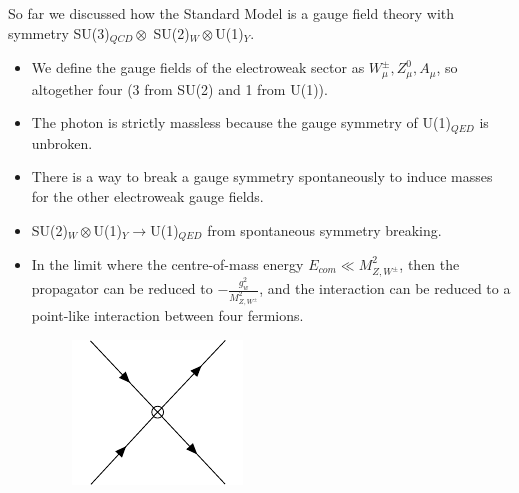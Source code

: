 \documentclass[relqm.tex]{subfiles}
\begin{document}
\chapter{}
    So far we discussed how the Standard Model is a gauge field theory with symmetry SU(3)$_{QCD}\otimes$ SU(2)$_W\otimes$U(1)$_{Y}$.
\begin{itemize}
    \item We define the gauge fields of the electroweak sector as $W^\pm_\mu,Z_\mu^0,A_\mu$, so altogether four (3 from SU(2) and 1 from U(1)).
    \item The photon is strictly massless because the gauge symmetry of U(1)$_{QED}$ is unbroken. 
    \item There is a way to break a gauge symmetry spontaneously to induce masses for the other electroweak gauge fields. 
    \item SU(2)$_W\otimes$U(1)$_Y\to$U(1)$_{QED}$ from spontaneous symmetry breaking.  
    \item In the limit where the centre-of-mass energy $E_{com}\ll M_{Z,W^{\pm}}^2$, then the propagator can be reduced to $-\frac{g_{w}^2}{M_{Z,W^{\pm}}^2}$, and the interaction can be reduced to a point-like interaction between four fermions. 
        \begin{figure}[H]
            \centering
            \includegraphics[scale=0.8]{diagrams/fermi.pdf}
        \end{figure}
\end{itemize}
\end{document}
